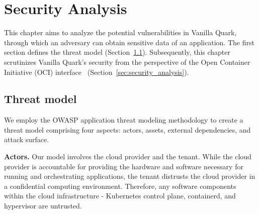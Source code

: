 \chapter{Security Analysis}
\label{sec:security_analyse}




This chapter aims to analyze the potential vulnerabilities in Vanilla Quark, through which an adversary can obtain sensitive data of an application. The first section defines the threat model (Section~\ref{sec:Threat_model}). 
Subsequently, this chapter scrutinizes Vanilla Quark's security from the perspective of the Open Container Initiative (OCI) interface~\cite*{oci-runtime-spec} (Section~\ref{sec:security_analysis}).

\section{Threat model}
\label{sec:Threat_model}
We employ the OWASP application threat modeling methodology\cite*{OWASP_Threat_Modeling} to create a threat model comprising four aspects: actors, assets, external dependencies, and attack surface. 

\textbf{Actors.} Our model involves the cloud provider and the tenant. While the cloud provider is accountable for providing the hardware and software necessary for running and orchestrating applications, the tenant distrusts the cloud provider 
in a confidential computing environment. Therefore, any software components within the cloud infrastructure - Kubernetes control plane\cite*{k8s}, containerd\cite*{containerd}, and hypervisor are untrusted.

